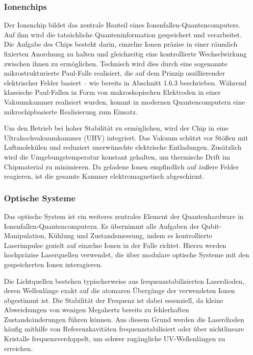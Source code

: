 \subsubsection{Ionenchips}

Der Ionenchip bildet das zentrale Bauteil eines Ionenfallen-Quantencomputers. Auf ihm wird die tatsächliche Quanteninformation gespeichert und verarbeitet. Die Aufgabe des Chips besteht darin, einzelne Ionen präzise in einer räumlich fixierten Anordnung zu halten und gleichzeitig eine kontrollierte Wechselwirkung zwischen ihnen zu ermöglichen. Technisch wird dies durch eine sogenannte mikrostrukturierte Paul-Falle realisiert, die auf dem Prinzip oszillierender elektrischer Felder basiert – wie bereits in Abschnitt 1.6.3 beschrieben. Während klassische Paul-Fallen in Form von makroskopischen Elektroden in einer Vakuumkammer realisiert wurden, kommt in modernen Quantencomputern eine mikrochipbasierte Realisierung zum Einsatz.

Um den Betrieb bei hoher Stabilität zu ermöglichen, wird der Chip in eine Ultrahochvakuumkammer (UHV) integriert. Das Vakuum schützt vor Stößen mit Luftmolekülen und reduziert unerwünschte elektrische Entladungen. Zusätzlich wird die Umgebungstemperatur konstant gehalten, um thermische Drift im Chipmaterial zu minimieren. Da geladene Ionen empfindlich auf äußere Felder reagieren, ist die gesamte Kammer elektromagnetisch abgeschirmt.

\subsubsection{Optische Systeme}

Das optische System ist ein weiteres zentrales Element der Quantenhardware in Ionenfallen-Quantencomputern. Es übernimmt alle Aufgaben der Qubit-Manipulation, Kühlung und Zustandsmessung, indem es kontrollierte Laserimpulse gezielt auf einzelne Ionen in der Falle richtet. Hierzu werden hochpräzise Laserquellen verwendet, die über modulare optische Systeme mit den gespeicherten Ionen interagieren. 

Die Lichtquellen bestehen typischerweise aus frequenzstabilisierten Laserdioden, deren Wellenlänge exakt auf die atomaren Übergänge der verwendeten Ionen abgestimmt ist. Die Stabilität der Frequenz ist dabei essenziell, da kleine Abweichungen von wenigen Megahertz bereits zu fehlerhaften Zustandsänderungen führen können. Aus diesem Grund werden die Laserdioden häufig mithilfe von Referenzkavitäten frequenzstabilisiert oder über nichtlineare Kristalle frequenzverdoppelt, um schwer zugängliche UV-Wellenlängen zu erreichen.


